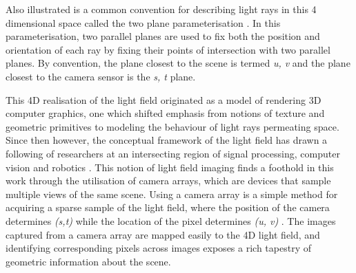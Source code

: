 Also illustrated is a common convention for describing light rays in this 4 dimensional space called the two plane parameterisation \cite{gortler1996lumigraph}. In this parameterisation, two parallel planes are used to fix both the position and orientation of each ray by fixing their points of intersection with two parallel planes. By convention, the plane closest to the scene is termed \textit{u, v} and the plane closest to the camera sensor is the \textit{s, t} plane.

This 4D realisation of the light field originated as a model of rendering 3D computer graphics, one which shifted emphasis from notions of texture and geometric primitives to modeling the behaviour of light rays permeating space. Since then however, the conceptual framework of the light field has drawn a following of researchers at an intersecting region of signal processing, computer vision and robotics \cite{dansereau2014phd}. This notion of light field imaging finds a foothold in this work through the utilisation of camera arrays, which are devices that sample multiple views of the same scene. Using a camera array is a simple method for acquiring a sparse sample of the light field, where the position of the camera determines \textit{(s,t)} while the location of the pixel determines \textit{(u, v)} \cite{yao2016camarray}. The images captured from a camera array are mapped easily to the 4D light field, and identifying corresponding pixels across images exposes a rich tapestry of geometric information about the scene. 


